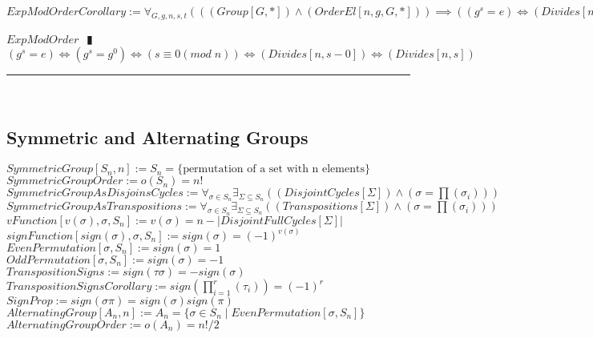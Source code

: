 \documentclass{book}
\newcommand{\abr}{:=}
\newcommand{\pipe}{$\phantom{(}\vrectangleblack\phantom{)}$}
\newcommand{\pr}[1]{\left(#1\right)}
\newcommand{\st}{\mathbin{|}}
\begin{document}
$ExpModOrderCorollary \abr \forall_{G, g, n, s, t}\pr{\pr{(Group[G, *]) \land (OrderEl[n, g, G, *])} \implies \pr{(g^s = e) \iff (Divides[n, s])}}$
\begin{enumerate}
  \lit $ExpModOrder$ \pipe $(g^s = e) \iff (g^s = g^0) \iff \pr{s \equiv 0 (mod \phantom{.} n)} \iff (Divides[n, s - 0]) \iff (Divides[n, s])$
\end{enumerate} \vspace{.75mm} \hrule \vspace{.75mm} \ \\


\subsection{Symmetric and Alternating Groups}
$SymmetricGroup[S_n, n] \abr S_n = \{\text{permutation of a set with n elements}\}$ \\
$SymmetricGroupOrder \abr o(S_n) = n!$ \\
$SymmetricGroupAsDisjoinsCycles \abr \forall_{\sigma \in S_n} \exists_{\Sigma \subseteq S_n}\pr{(DisjointCycles[\Sigma]) \land \pr{\sigma = \prod(\sigma_i)}}$ \\
$SymmetricGroupAsTranspositions \abr \forall_{\sigma \in S_n} \exists_{\Sigma \subseteq S_n}\pr{(Transpositions[\Sigma]) \land \pr{\sigma = \prod(\sigma_i)}}$ \\

$vFunction[v(\sigma), \sigma, S_n] \abr v(\sigma) = n - |DisjointFullCycles[\Sigma]|$ \\
$signFunction[sign(\sigma), \sigma, S_n] \abr sign(\sigma) = (-1)^{v(\sigma)}$ \\
$EvenPermutation[\sigma, S_n] \abr sign(\sigma) = 1$ \\
$OddPermutation[\sigma, S_n] \abr sign(\sigma) = -1$ \\

$TranspositionSigns \abr sign(\tau \sigma) = -sign(\sigma)$ \\
$TranspositionSignsCorollary \abr sign\pr{\prod_{i = 1}^{r}(\tau_i)} = (-1)^r$ \\
$SignProp \abr sign(\sigma \pi) = sign(\sigma) sign(\pi)$ \\

$AlternatingGroup[A_n, n] \abr A_n = \{\sigma \in S_n \st EvenPermutation[\sigma, S_n]\}$ \\
$AlternatingGroupOrder \abr o(A_n) = n!/2$ \\
\end{document}
